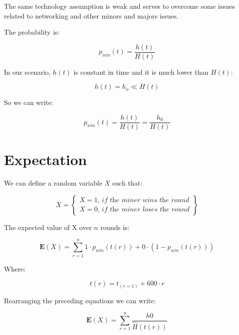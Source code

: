 \documentclass{article}
\begin{document}
The same technology assumption is weak and serves to overcome some issues related to networking and other minors and majors issues.

The probability is:

\begin{equation}
    p_{win}(t) = \frac{h(t)}{H(t)} \label{eq2}
\end{equation}

In our scenario, $h(t)$ is constant in time and it is much lower than $H(t)$: 

\begin{equation}
    h(t) = h_{o} \ll H(t) \label{eq3}
\end{equation}

So we can write:

\begin{equation}
    p_{win}(t) = \frac{h(t)}{H(t)} = \frac{h_{0}}{H(t)} \label{eq4}
\end{equation}

\section{Expectation}

We can define a random variable $X$ such that:

\begin{equation}
X = \left\{
        \begin{array}{ll}
            X = 1 \textit{, if the miner wins the round} \\
            X = 0 \textit{, if the miner loses the round}
        \end{array}
    \right \} \label{rndX}
\end{equation}

The expected value of X over $n$ rounds is:

\begin{equation}
    \mathbf{E}(X) = \displaystyle\sum_{r=1}^{n} 1 \cdot p_{win}(t(r)) + 0 \cdot ( 1 - p_{win}(t(r))) \label{eq5}
\end{equation}

Where:

\begin{equation}
    t(r) = t_{(r=1)} + 600 \cdot r \label{eq6}
\end{equation}

Rearranging the preceding equations we can write:

\begin{equation}
    \mathbf{E}(X) = \displaystyle\sum_{r=1}^{n} \frac{h0}{\widehat{H}(t(r))} \label{expectationPwinOverRounds}
\end{equation}
\end{document}
